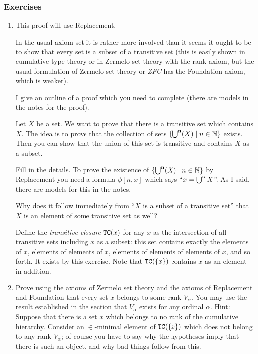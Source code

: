 \documentclass[12pt]{book}
\begin{document}
\subsubsection{Exercises}
\begin{enumerate}
\item  This proof will use Replacement.

In the usual axiom set it is rather more involved than it seems it
ought to be to show that every set is a subset of a transitive set
(this is easily shown in cumulative type theory or in Zermelo set
theory with the rank axiom, but the usual formulation of Zermelo set
theory or {\em ZFC\/} has the Foundation axiom, which is weaker).

I give an outline of a proof which you need to complete (there are models
in the notes for the proof).

Let $X$ be a set.  We want to prove that there is a transitive set
which contains $X$.  The idea is to prove that the collection of sets
$\{\bigcup^{\bf n}(X)\mid n \in {\mathbb N}\}$ exists.  Then you can show that
the union of this set is transitive and contains $X$ as a subset.

Fill in the details.  To prove the existence of $\{\bigcup^{\bf n}(X)\mid n
\in {\mathbb N}\}$ by Replacement you need a formula $\phi[n,x]$ which
says ``$x =\bigcup^{\bf n} X$''.  As I said, there are models for this in
the notes.

Why does it follow immediately from ``$X$ is a subset of a transitive
set'' that $X$ is an element of some transitive set as well?

Define the {\em transitive closure\/} ${\tt TC}(x)$ for any $x$ as the intersection of all transitive sets including $x$ as a subset:
this set contains exactly the elements of $x$, elements of elements of $x$, elements of elements of elements of $x$, and so forth.  It exists by this exercise.
Note that ${\tt TC}(\{x\})$ contains $x$ as an element in addition.

\item Prove using the axioms of Zermelo set theory and the axioms of Replacement and Foundation that every set $x$ belongs to some rank $V_{\alpha}$.  You may use the result established in the section that $V_{\alpha}$ exists for any ordinal $\alpha$.  Hint:  Suppose that there is a set $x$ which belongs to no rank of the cumulative hierarchy.  Consider an $\in$-minimal element of ${\tt TC}(\{x\})$ which does not belong to any rank $V_{\alpha}$; of course you have to say why the hypotheses imply that there is such an object, and why bad things follow from this.


\end{enumerate}
\end{document}
